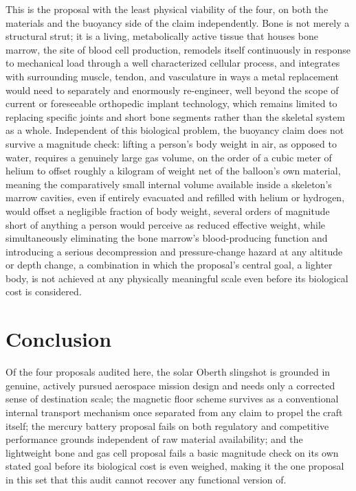 \documentclass[11pt]{article}
\begin{document}
This is the proposal with the least physical viability of the four, on both the materials and the buoyancy side of the claim independently. Bone is not merely a structural strut; it is a living, metabolically active tissue that houses bone marrow, the site of blood cell production, remodels itself continuously in response to mechanical load through a well characterized cellular process, and integrates with surrounding muscle, tendon, and vasculature in ways a metal replacement would need to separately and enormously re-engineer, well beyond the scope of current or foreseeable orthopedic implant technology, which remains limited to replacing specific joints and short bone segments rather than the skeletal system as a whole. Independent of this biological problem, the buoyancy claim does not survive a magnitude check: lifting a person's body weight in air, as opposed to water, requires a genuinely large gas volume, on the order of a cubic meter of helium to offset roughly a kilogram of weight net of the balloon's own material, meaning the comparatively small internal volume available inside a skeleton's marrow cavities, even if entirely evacuated and refilled with helium or hydrogen, would offset a negligible fraction of body weight, several orders of magnitude short of anything a person would perceive as reduced effective weight, while simultaneously eliminating the bone marrow's blood-producing function and introducing a serious decompression and pressure-change hazard at any altitude or depth change, a combination in which the proposal's central goal, a lighter body, is not achieved at any physically meaningful scale even before its biological cost is considered.

\section{Conclusion}

Of the four proposals audited here, the solar Oberth slingshot is grounded in genuine, actively pursued aerospace mission design and needs only a corrected sense of destination scale; the magnetic floor scheme survives as a conventional internal transport mechanism once separated from any claim to propel the craft itself; the mercury battery proposal fails on both regulatory and competitive performance grounds independent of raw material availability; and the lightweight bone and gas cell proposal fails a basic magnitude check on its own stated goal before its biological cost is even weighed, making it the one proposal in this set that this audit cannot recover any functional version of.
\end{document}
